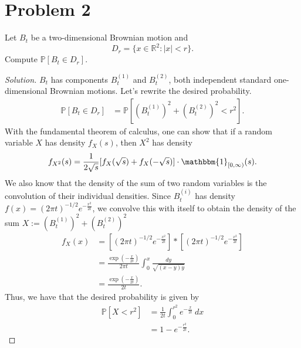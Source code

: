 \documentclass[11pt,letterpaper]{report}
\newcommand{\reals}{\mathbb{R}}
\newcommand{\Prob}{\mathbb{P}}
\newcommand{\ind}{\mathbbm{1}}
\newenvironment{solution}
{\begin{proof}[Solution]}
{\end{proof}}
\begin{document}
\section*{Problem 2}
Let $B_t$ be a two-dimensional Brownian motion and
\[
D_r = \{x\in \reals^2: |x|<r\}.
\]
Compute $\Prob[B_t\in D_r]$.
\begin{solution}
	$B_t$ has components $B^{(1)}_t$ and $B^{(2)}_t$, both independent standard one-dimensional Brownian motions. Let's rewrite the desired probability.
	\begin{align*}
		\Prob[B_t\in D_r] &= \Prob[(B^{(1)}_t)^2 + (B^{(2)}_t)^2 < r^2].
	\end{align*}
	With the fundamental theorem of calculus, one can show that if a random variable $X$ has density $f_X(s)$, then $X^2$ has density
	\[
	f_{X^2}(s) = \frac{1}{2\sqrt{s}}[f_X(\sqrt{s}) + f_X(-\sqrt{s})]\cdot \ind_{[0, \infty)}(s).
	\]
	We also know that the density of the sum of two random variables is the convolution of their individual densities. Since $B_t^{({i})}$ has density $f(x) = (2\pi t)^{-1/2}e^{-\frac{x^2}{2t}}$, we convolve this with itself to obtain the density of the sum $X := (B^{(1)}_t)^2 + (B^{(2)}_t)^2$
	\begin{align*}
		f_X(x) &= \left[(2\pi t)^{-1/2}e^{-\frac{x^2}{2t}}\right]*\left[(2\pi t)^{-1/2}e^{-\frac{x^2}{2t}}\right]\\
		&= \frac{\exp(-\frac{x}{2t})}{2\pi t}\int_0^x\frac{dy}{\sqrt{(x-y)y}}\\
		&= \frac{\exp(-\frac{x}{2t})}{2t}.
	\end{align*}
	Thus, we have that the desired probability is given by
	\begin{align*}
		\Prob[X<r^2] &= \frac{1}{2t}\int_0^{r^2}e^{-\frac{x}{2t}}\ dx\\
		&= 1-e^{-\frac{r^2}{2t}}.
	\end{align*}
\end{solution}
\end{document}
